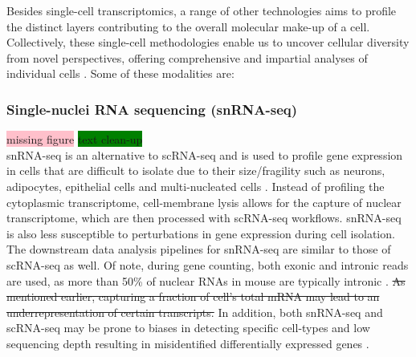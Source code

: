 Besides single-cell transcriptomics, a range of other technologies aims to profile the distinct layers contributing to the overall molecular make-up of a cell. Collectively, these single-cell methodologies enable us to uncover cellular diversity from novel perspectives, offering comprehensive and impartial analyses of individual cells \textbf{\cite{stein_single-cell_2021}}. Some of these modalities are:

\subsubsection{Single-nuclei RNA sequencing (snRNA-seq)}
\colorbox{pink}{missing figure} \colorbox{green}{text clean-up}\\
	snRNA-seq is an alternative to scRNA-seq and is used to profile gene expression in cells that are difficult to isolate due to their size/fragility such as neurons, adipocytes, epithelial cells and multi-nucleated cells \textbf{\cite{kim_perspectives_2023}}. Instead of profiling the cytoplasmic transcriptome, cell-membrane lysis allows for the capture of nuclear transcriptome, which are then processed with scRNA-seq workflows. snRNA-seq is also less susceptible to perturbations in gene expression during cell isolation. The downstream data analysis pipelines for snRNA-seq are similar to those of scRNA-seq as well. Of note, during gene counting, both exonic and intronic reads are used, as more than 50\% of nuclear RNAs in mouse are typically intronic \textbf{\cite{bakken_single-nucleus_2018}}. \st{As mentioned earlier, capturing a fraction of cell’s total mRNA may lead to an underrepresentation of certain transcripts.} In addition, both snRNA-seq and scRNA-seq may be prone to biases in detecting specific cell-types \textbf{\cite{kim_perspectives_2023,oh_comparison_2022}}  and low sequencing depth resulting in misidentified differentially expressed genes \textbf{\cite{quatredeniers_meta-analysis_2023}}.

